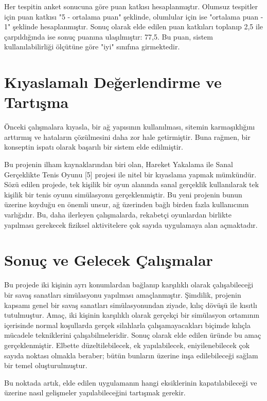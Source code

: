 \documentclass[a4paper, 12pt, titlepage]{article}
\begin{document}
Her tespitin anket sonucuna göre puan katkısı hesaplanmıştır. Olumsuz tespitler için puan katkısı
"5 - ortalama puan" şeklinde, olumlular için ise "ortalama puan - 1" şeklinde hesaplanmıştır. Sonuç
olarak elde edilen puan katkıları toplanıp 2,5 ile çarpıldığında ise sonuç puanına ulaşılmıştır: 77,5.
Bu puan, sistem kullanılabilirliği ölçütüne göre "iyi" sınıfına girmektedir.


\newpage
\section{Kıyaslamalı Değerlendirme ve Tartışma}
Önceki çalışmalara kıyasla, bir ağ yapısının kullanılması, sitemin karmaşıklığını arttırmış ve
hataların çözülmesini daha zor hale getirmiştir. Buna rağmen, bir konseptin ispatı olarak başarılı
bir sistem elde edilmiştir.

Bu projenin ilham kaynaklarından biri olan, Hareket Yakalama ile
Sanal Gerçeklikte Tenis Oyunu [5] projesi ile nitel bir kıyaslama yapmak mümkündür. Sözü edilen
projede, tek kişilik bir oyun alanında sanal gerçeklik kullanılarak tek kişilik bir tenis oyunu
simülasyonu gerçeklenmiştir. Bu yeni projenin bunun üzerine koyduğu en önemli unsur, ağ üzerinden
bağlı birden fazla kullanıcının varlığıdır. Bu, daha ilerleyen çalışmalarda, rekabetçi oyunlardan
birlikte yapılması gerekecek fiziksel aktivitelere çok sayıda uygulamaya alan açmaktadır.

\newpage
\section{Sonuç ve Gelecek Çalışmalar}
Bu projede iki kişinin ayrı konumlardan bağlanıp karşılıklı olarak çalışabileceği bir savaş
sanatları simülasyonu yapılması amaçlanmıştır. Şimdilik, projenin kapsamı genel bir savaş sanatları
simülasyonundan ziyade, kılıç dövüşü ile kısıtlı tutulmuştur. Amaç, iki kişinin karşılıklı olarak
gerçekçi bir simülasyon ortamının içerisinde normal koşullarda gerçek silahlarla çalışamayacakları
biçimde kılıçla mücadele tekniklerini çalışabilmeleridir. Sonuç olarak elde edilen üründe bu amaç
gerçeklenmiştir. Elbette düzeltilebilecek, ek yapılabilecek, eniyilenebilecek çok sayıda noktası
olmakla beraber; bütün bunların üzerine inşa edilebileceği sağlam bir temel oluşturulmuştur.

Bu noktada artık, elde edilen uygulamanın hangi eksiklerinin kapatılabileceği ve üzerine nasıl
gelişmeler yapılabileceğini tartışmak gerekir.
\end{document}
